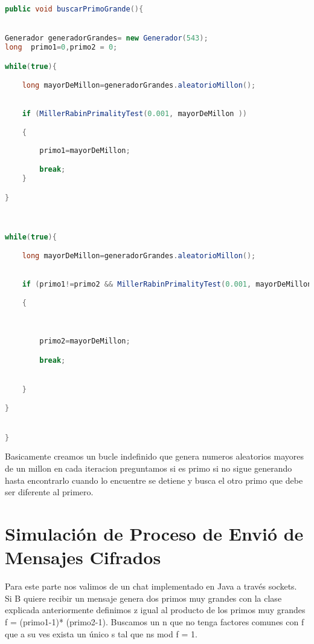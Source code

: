 \documentclass[a4paper,10pt]{article}
\begin{document}
\begin{lstlisting}[language=java]
public void buscarPrimoGrande(){


Generador generadorGrandes= new Generador(543);
long  primo1=0,primo2 = 0;

while(true){

	long mayorDeMillon=generadorGrandes.aleatorioMillon();
	

	if (MillerRabinPrimalityTest(0.001, mayorDeMillon )) 

	{
				
		primo1=mayorDeMillon; 

		break;
	}

}



while(true){

	long mayorDeMillon=generadorGrandes.aleatorioMillon();
	

	if (primo1!=primo2 && MillerRabinPrimalityTest(0.001, mayorDeMillon )) 

	{


				
		primo2=mayorDeMillon; 

		break;


	}

}


}


\end{lstlisting}

Basicamente creamos un bucle indefinido que genera numeros aleatorios mayores de un millon  en cada iteracion preguntamos si es primo si no sigue generando hasta encontrarlo cuando lo encuentre se detiene y busca el otro primo que debe ser diferente al primero.


%

\section{Simulación de Proceso de Envió de Mensajes Cifrados}

Para este parte nos valimos de un chat implementado en Java a través sockets.\\


Si B quiere recibir un mensaje genera dos primos muy grandes con la clase explicada anteriormente definimos z igual al producto de los primos muy grandes f = (primo1-1)* (primo2-1). Buscamos un n que no tenga factores comunes con f que a su ves exista un único s tal que ns mod f = 1.\\
\end{document}
